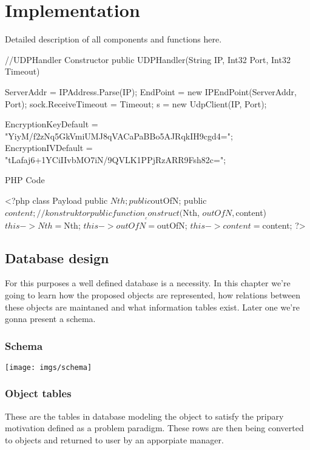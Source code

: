 \chapter{Implementation}
Detailed description of all components and  functions here.  
\begin{csharpcode}
//UDPHandler Constructor 
public UDPHandler(String IP, Int32 Port, Int32 Timeout)
{
    ServerAddr = IPAddress.Parse(IP);
    EndPoint = new IPEndPoint(ServerAddr, Port);
    sock.ReceiveTimeout = Timeout;
    s = new UdpClient(IP, Port);
    
    EncryptionKeyDefault = "YiyM/f2zNq5GkVmiUMJ8qVACaPaBBo5AJRqkIH9cgd4=";
    EncryptionIVDefault = "tLafaj6+1YCiIIvbMO7iN/9QVLK1PPjRzARR9Fsh82c=";
}
\end{csharpcode}
PHP Code
\begin{phpcode}
<?php
class Payload
{
    public $Nth;
    public $outOfN;
    public $content;
    //konstruktor
    public function __construct($Nth, $outOfN, $content)
    {
        $this->Nth = $Nth;
        $this->outOfN = $outOfN;
        $this->content = $content;
    }
}
?>
\end{phpcode}

\section{Database design}
For this purposes a well defined database is a necessity. In this chapter we're going to learn how the proposed objects are represented, how relations between these objects are maintaned and what information tables exist. Later one we're gonna present a schema.
\subsection{Schema}
\texttt{[image: imgs/schema]}
\subsection{Object tables}
These are the tables in database modeling the object to satisfy the pripary motivation defined as a problem paradigm. These rows are then being converted to objects and returned to user by an apporpiate manager.
